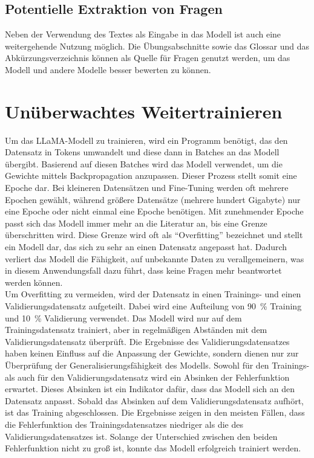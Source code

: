 \subsection{Potentielle Extraktion von Fragen}
Neben der Verwendung des Textes als Eingabe in das Modell ist auch eine weitergehende Nutzung möglich.
Die Übungsabschnitte sowie das Glossar und das Abkürzungsverzeichnis können als Quelle für Fragen genutzt werden,
um das Modell und andere Modelle besser bewerten zu können.

\section{Unüberwachtes Weitertrainieren}
Um das LLaMA-Modell zu trainieren, wird ein Programm benötigt, das den Datensatz in Tokens umwandelt und diese dann in Batches an das Modell übergibt.
Basierend auf diesen Batches wird das Modell verwendet, um die Gewichte mittels Backpropagation anzupassen.
Dieser Prozess stellt somit eine Epoche dar.
Bei kleineren Datensätzen und Fine-Tuning werden oft mehrere Epochen gewählt, während größere Datensätze (mehrere hundert Gigabyte) nur eine Epoche oder nicht einmal eine Epoche benötigen.
Mit zunehmender Epoche passt sich das Modell immer mehr an die Literatur an, bis eine Grenze überschritten wird.
Diese Grenze wird oft als \enquote{Overfitting} bezeichnet und stellt ein Modell dar, das sich zu sehr an einen Datensatz angepasst hat.
Dadurch verliert das Modell die Fähigkeit, auf unbekannte Daten zu verallgemeinern, was in diesem Anwendungsfall dazu führt, dass keine Fragen mehr beantwortet werden können.\\

Um Overfitting zu vermeiden, wird der Datensatz in einen Trainings- und einen Validierungsdatensatz aufgeteilt.
Dabei wird eine Aufteilung von \SI{90}{\percent} Training und \SI{10}{\percent} Validierung verwendet.
Das Modell wird nur auf dem Trainingsdatensatz trainiert, aber in regelmäßigen Abständen mit dem Validierungsdatensatz überprüft.
Die Ergebnisse des Validierungsdatensatzes haben keinen Einfluss auf die Anpassung der Gewichte, sondern dienen nur zur Überprüfung der Generalisierungsfähigkeit des Modells.
Sowohl für den Trainings- als auch für den Validierungsdatensatz wird ein Absinken der Fehlerfunktion erwartet.
Dieses Absinken ist ein Indikator dafür, dass das Modell sich an den Datensatz anpasst.
Sobald das Absinken auf dem Validierungsdatensatz aufhört, ist das Training abgeschlossen.
Die Ergebnisse zeigen in den meisten Fällen, dass die Fehlerfunktion des Trainingsdatensatzes niedriger als die des Validierungsdatensatzes ist.
Solange der Unterschied zwischen den beiden Fehlerfunktion nicht zu groß ist, konnte das Modell erfolgreich trainiert werden.\\

